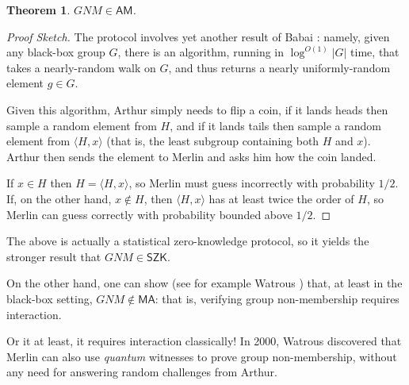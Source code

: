 \documentclass[11pt]{report}
\theoremstyle{plain}
\newtheorem{theorem}{Theorem}[section]
\theoremstyle{definition}
\begin{document}
\begin{theorem}
\label{gnmam}$GNM \in \mathsf{AM}$.
\end{theorem}
\begin{proof}[Proof Sketch] The protocol involves yet another result of Babai \cite{DBLP:conf/stoc/Babai91}: namely, given any black-box group $G$, there is an algorithm, running in $\log^{O(1)} |G|$ time, that takes a nearly-random walk on $G$, and thus returns a nearly uniformly-random element $g\in G$.

Given this algorithm, Arthur simply needs to flip a coin, if it lands heads then sample a random element from $H$, and if it lands tails then sample a random element from $\langle H,x\rangle$ (that is, the least subgroup containing both $H$ and $x$).  Arthur then sends the element to Merlin and asks him how the coin landed.

If $x\in H$ then $H = \langle H,x\rangle$, so Merlin must guess incorrectly with probability $1/2$.  If, on the other hand, $x\not\in H$, then $\langle H,x\rangle$ has at least twice the order of $H$, so Merlin can guess correctly with probability bounded above $1/2$.
\end{proof}

The above is actually a statistical zero-knowledge protocol, so it yields the stronger result that $GNM\in \mathsf{SZK}$.

On the other hand, one can show (see for example Watrous \cite{DBLP:conf/focs/Watrous00}) that, at least in the black-box setting, $GNM\not\in \mathsf{MA}$: that is, verifying group non-membership requires interaction.

Or it at least, it requires interaction classically!  In 2000, Watrous discovered that Merlin can also use {\em quantum} witnesses to prove group non-membership, without any need for answering random challenges from Arthur.
\end{document}

